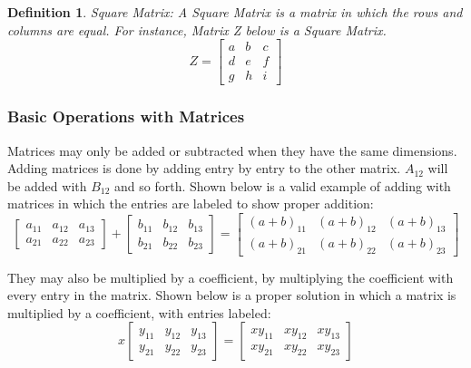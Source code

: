 \documentclass[final,1p,12pt]{elsarticle}
\newtheorem{definition}{Definition}
\begin{document}
        \begin{definition}Square Matrix:
        A Square Matrix is a matrix in which the rows and columns are equal. For instance, Matrix Z below is a Square Matrix.
        \begin{equation*}%
            Z =
            \begin{bmatrix}
                a & b & c\\
                d & e & f\\
                g & h & i
            \end{bmatrix}
        \end{equation*}
        \end{definition}
        
        \subsubsection{Basic Operations with Matrices}
        Matrices may only be added or subtracted when they have the same dimensions. Adding matrices is done by adding entry by entry to the other matrix. $A_{12}$ will be added with $B_{12}$ and so forth. Shown below is a valid example of adding with matrices in which the entries are labeled to show proper addition:
        \begin{equation*}
            \begin{bmatrix}
                a_{11} & a_{12} & a_{13} \\
                a_{21} & a_{22} & a_{23}
            \end{bmatrix}
            +
            \begin{bmatrix}
                b_{11} & b_{12} & b_{13} \\
                b_{21} & b_{22} & b_{23}
            \end{bmatrix}
            =
            \begin{bmatrix}
                (a+b)_{11} & (a+b)_{12} & (a+b)_{13} \\
                (a+b)_{21} & (a+b)_{22} & (a+b)_{23}
            \end{bmatrix}
        \end{equation*}
        
        They may also be multiplied by a coefficient, by multiplying the coefficient with every entry in the matrix. Shown below is a proper solution in which a matrix is multiplied by a coefficient, with entries labeled:
         \begin{equation*}
         x
            \begin{bmatrix}
                y_{11} & y_{12} & y_{13} \\
                y_{21} & y_{22} & y_{23}
            \end{bmatrix}
        =
            \begin{bmatrix}
                xy_{11} & xy_{12} & xy_{13} \\
                xy_{21} & xy_{22} & xy_{23}
            \end{bmatrix}
        \end{equation*}
        
\end{document}
